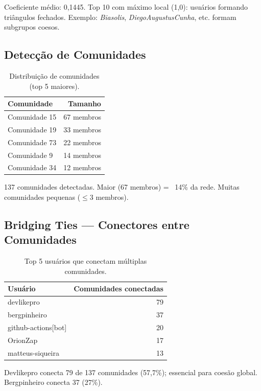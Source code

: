 \documentclass[12pt,a4paper]{article}
\begin{document}
Coeficiente médio: 0,1445. Top 10 com máximo local (1,0): usuários formando triângulos fechados. Exemplo: \textit{Biasolis}, \textit{DiegoAugustusCunha}, etc. formam subgrupos coesos.

\subsection{Detecção de Comunidades}

\begin{table}[h]
  \centering
  \caption{Distribuição de comunidades (top 5 maiores).}
  \label{tab:comunidades}
  \begin{tabular}{l|r}
    \toprule
    \textbf{Comunidade} & \textbf{Tamanho} \\
    \midrule
    Comunidade 15 & 67 membros \\
    Comunidade 19 & 33 membros \\
    Comunidade 73 & 22 membros \\
    Comunidade 9  & 14 membros \\
    Comunidade 34 & 12 membros \\
    \bottomrule
  \end{tabular}
\end{table}

137 comunidades detectadas. Maior (67 membros) = ~14\% da rede. Muitas comunidades pequenas ($\leq 3$ membros).

\subsection{Bridging Ties — Conectores entre Comunidades}

\begin{table}[h]
  \centering
  \caption{Top 5 usuários que conectam múltiplas comunidades.}
  \label{tab:bridging}
  \begin{tabular}{l|r}
    \toprule
    \textbf{Usuário} & \textbf{Comunidades conectadas} \\
    \midrule
    devlikepro       & 79 \\
    bergpinheiro     & 37 \\
    github-actions[bot] & 20 \\
    OrionZap         & 17 \\
    matteus-siqueira & 13 \\
    \bottomrule
  \end{tabular}
\end{table}

Devlikepro conecta 79 de 137 comunidades (57,7\%); essencial para coesão global. Bergpinheiro conecta 37 (27\%).
\end{document}
